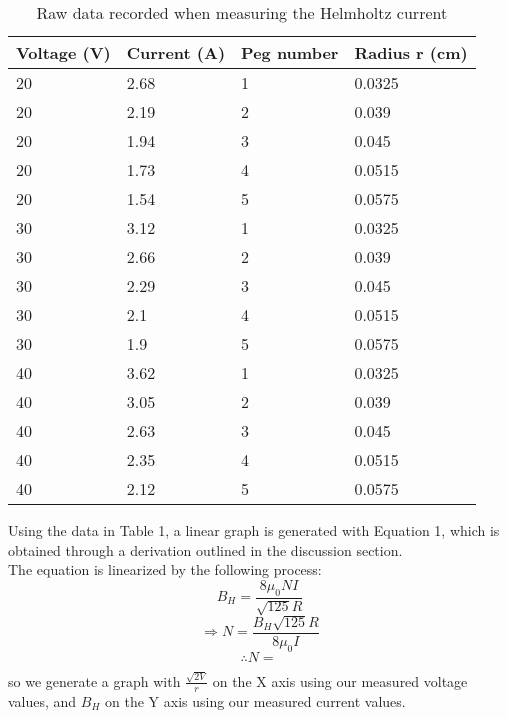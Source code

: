 \documentclass[letterpaper]{article}
\begin{document}
\begin{table}[H]
\centering
\begin{tabular}{|l|l|l|l|}
\hline
Voltage (V) & Current (A) & Peg number & Radius r (cm) \\ \hline
20          & 2.68        & 1          & 0.0325        \\ \hline
20          & 2.19        & 2          & 0.039         \\ \hline
20          & 1.94        & 3          & 0.045         \\ \hline
20          & 1.73        & 4          & 0.0515        \\ \hline
20          & 1.54        & 5          & 0.0575        \\ \hline
30          & 3.12        & 1          & 0.0325        \\ \hline
30          & 2.66        & 2          & 0.039         \\ \hline
30          & 2.29        & 3          & 0.045         \\ \hline
30          & 2.1         & 4          & 0.0515        \\ \hline
30          & 1.9         & 5          & 0.0575        \\ \hline
40          & 3.62        & 1          & 0.0325        \\ \hline
40          & 3.05        & 2          & 0.039         \\ \hline
40          & 2.63        & 3          & 0.045         \\ \hline
40          & 2.35        & 4          & 0.0515        \\ \hline
40          & 2.12        & 5          & 0.0575        \\ \hline
\end{tabular}
\caption{Raw data recorded when measuring the Helmholtz current}
\end{table}


Using the data in Table 1, a linear graph is generated with Equation 1,
which is obtained through a derivation outlined in the discussion section.
\\The equation is linearized by the following process:
$$ B_H = \frac{8\mu_0NI}{\sqrt{125}R} $$
$$ \Rightarrow N = \frac{B_H \sqrt{125} R}{8\mu_0I} $$
$$ \therefore N= \frac{}{} $$
 so we generate a graph
with $\frac{\sqrt{2V}}{r}$ on the X axis using our measured voltage values, and $B_H$ on the Y axis
using our measured current values.
\end{document}
